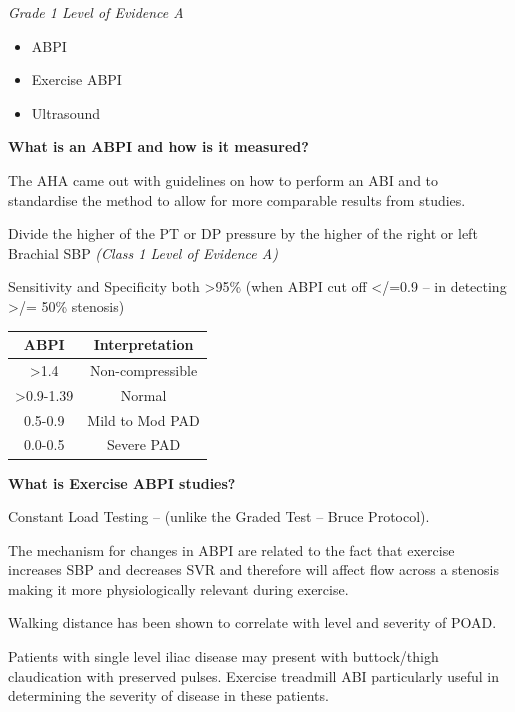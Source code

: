 \documentclass[
]{book}
\begin{document}
\emph{Grade 1 Level of Evidence A}

\begin{itemize}
\item
  ABPI
\item
  Exercise ABPI
\item
  Ultrasound
\end{itemize}

\textbf{What is an ABPI and how is it measured?}

The AHA came out with guidelines on how to perform an ABI and to
standardise the method to allow for more comparable results from
studies.

Divide the higher of the PT or DP pressure by the higher of the right or
left Brachial SBP \emph{(Class 1 Level of Evidence A)}
\citep{aboyansMeasurementInterpretationAnkleBrachial2012}

Sensitivity and Specificity both \textgreater95\% (when ABPI cut off \textless/=0.9 -- in
detecting \textgreater/= 50\% stenosis) \citep{yaoAnkleSystolicPressure2005, ourielCriticalEvaluationStress1982}

\begin{longtable}[]{@{}cc@{}}
\toprule()
\textbf{ABPI} & Interpretation \\
\midrule()
\endhead
\textgreater1.4 & Non-compressible \\
\textgreater0.9-1.39 & Normal \\
0.5-0.9 & Mild to Mod PAD \\
0.0-0.5 & Severe PAD \\
\bottomrule()
\end{longtable}

\textbf{What is Exercise ABPI studies?}

Constant Load Testing -- (unlike the Graded Test -- Bruce Protocol).

The mechanism for changes in ABPI are related to the fact that exercise
increases SBP and decreases SVR and therefore will affect flow across a
stenosis making it more physiologically relevant during exercise.
\citep{nicolaiReliabilityTreadmillTesting2009, alqahtaniPredictorsChangeAnkleBrachial2018}

Walking distance has been shown to correlate with level and severity of
POAD. \citep{strandnessHemodynamicsSurgeons1975a}

Patients with single level iliac disease may present with buttock/thigh
claudication with preserved pulses. Exercise treadmill ABI particularly
useful in determining the severity of disease in these patients.
\citep{aboyansGeneralPrognosisPatients2010}
\end{document}
